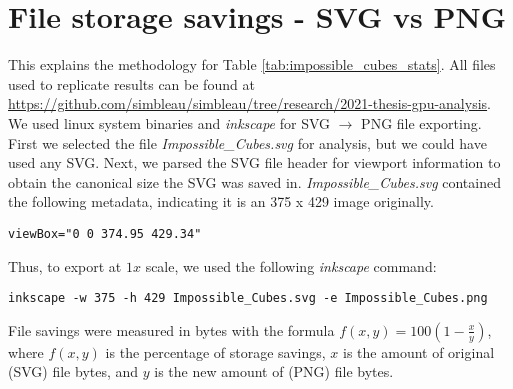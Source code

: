 \appendix
{}

\section{File storage savings - SVG vs PNG}
\label{appendix:svg_vs_png}
This explains the methodology for Table \ref{tab:impossible_cubes_stats}.
All files used to replicate results can be found at \href{https://github.com/simbleau/simbleau/tree/research/2021-thesis-gpu-analysis}{https://github.com/simbleau/simbleau/tree/research/2021-thesis-gpu-analysis}. We used linux system binaries and \textit{inkscape} for SVG $\rightarrow$ PNG file exporting.\\

First we selected the file \textit{Impossible\_Cubes.svg} for analysis, but we could have used any SVG. Next, we parsed the SVG file header for viewport information to obtain the canonical size the SVG was saved in. \textit{Impossible\_Cubes.svg} contained the following metadata, indicating it is an 375 x 429 image originally.

\begin{verbatim}
viewBox="0 0 374.95 429.34"
\end{verbatim}

Thus, to export at $1x$ scale, we used the following \textit{inkscape} command:

\begin{verbatim}
inkscape -w 375 -h 429 Impossible_Cubes.svg -e Impossible_Cubes.png
\end{verbatim}

File savings were measured in bytes with the formula $f(x,y)=100(1-\frac{x}{y})$, where $f(x,y)$ is the percentage of storage savings, $x$ is the amount of original (SVG) file bytes, and $y$ is the new amount of (PNG) file bytes.